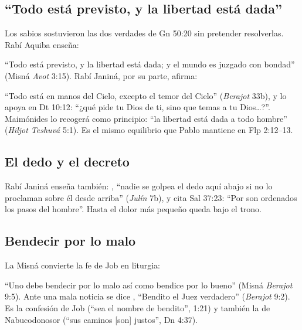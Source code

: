 
\subsection{“Todo está previsto, y la libertad está dada”}
Los sabios sostuvieron las dos verdades de Gn 50:20 sin pretender resolverlas. Rabí Aquiba enseña:


``Todo está previsto, y la libertad está dada; y el mundo es juzgado con bondad'' (Misná \emph{Avot} 3:15). Rabí Janiná, por su parte, afirma:


``Todo está en manos del Cielo, excepto el temor del Cielo'' (\emph{Berajot} 33b), y lo apoya en Dt 10:12: ``¿qué pide \SENOR{} tu Dios de ti, sino que temas a \SENOR{} tu Dios\ldots?''. Maimónides lo recogerá como principio: ``la libertad está dada a todo hombre'' (\emph{Hiljot Teshuvá} 5:1). Es el mismo equilibrio que Pablo mantiene en Flp 2:12--13.


\subsection{El dedo y el decreto}
Rabí Janiná enseña también: , ``nadie se golpea el dedo aquí abajo si no lo proclaman sobre él desde arriba'' (\emph{Julín} 7b), y cita Sal 37:23: ``Por \SENOR{} son ordenados los pasos del hombre''. Hasta el dolor más pequeño queda bajo el trono.

\subsection{Bendecir por lo malo}
La Misná convierte la fe de Job en liturgia:


``Uno debe bendecir por lo malo así como bendice por lo bueno'' (Misná \emph{Berajot} 9:5). Ante una mala noticia se dice , ``Bendito el Juez verdadero'' (\emph{Berajot} 9:2). Es la confesión de Job (``sea el nombre de \SENOR{} bendito'', 1:21) y también la de Nabucodonosor (``sus caminos [son] justos'', Dn 4:37).

